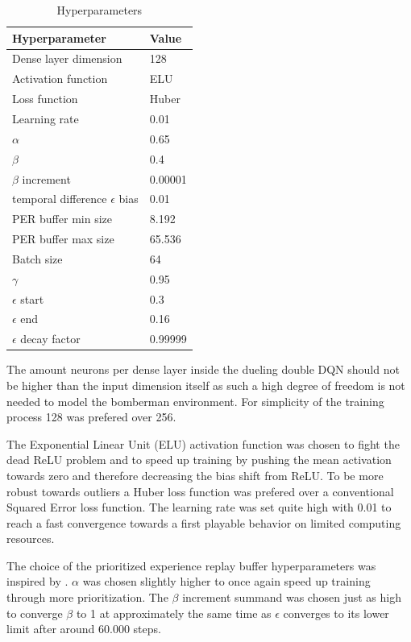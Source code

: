 \begin{table}[hbt!]
	\caption{Hyperparameters}
	\label{tab:hyperparameters}
	\begin{tabular}{|p{}|p{}|}
		\hline
		\textbf{Hyperparameter} & \textbf{Value} \\ \hline
		Dense layer dimension & 128 \\ \hline
		\hline
		Activation function & ELU \\ \hline
		Loss function & Huber \\ \hline
		Learning rate & 0.01 \\ \hline
		\hline
		$\alpha$ & 0.65 \\ \hline
		$\beta$ & 0.4 \\ \hline
		$\beta$ increment & 0.00001 \\ \hline
		temporal difference $\epsilon$ bias & 0.01 \\ \hline
		\hline
		PER buffer min size & 8.192 \\ \hline
		PER buffer max size & 65.536 \\ \hline
		Batch size & 64 \\ \hline
		\hline
		$\gamma$ & 0.95 \\ \hline
		$\epsilon$ start & 0.3 \\ \hline
		$\epsilon$ end & 0.16 \\ \hline
		$\epsilon$ decay factor & 0.99999 \\ \hline
	\end{tabular}
\end{table}

The amount neurons per dense layer inside the dueling double DQN should not be higher than the input dimension itself as such a high degree of freedom is not needed to model the bomberman environment. For simplicity of the training process 128 was prefered over 256. 

The Exponential Linear Unit (ELU) activation function was chosen to fight the dead ReLU problem and to speed up training by pushing the mean activation towards zero and therefore decreasing the bias shift from ReLU. To be more robust towards outliers a Huber loss function was prefered over a conventional Squared Error loss function. The learning rate was set quite high with 0.01 to reach a fast convergence towards a first playable behavior on limited computing resources. 

The choice of the prioritized experience replay buffer hyperparameters was inspired by \cite{Schaul2016}. $\alpha$ was chosen slightly higher to once again speed up training through more prioritization. The $\beta$ increment summand was chosen just as high to converge $\beta$ to 1 at approximately the same time as $\epsilon$ converges to its lower limit after around 60.000 steps. 

